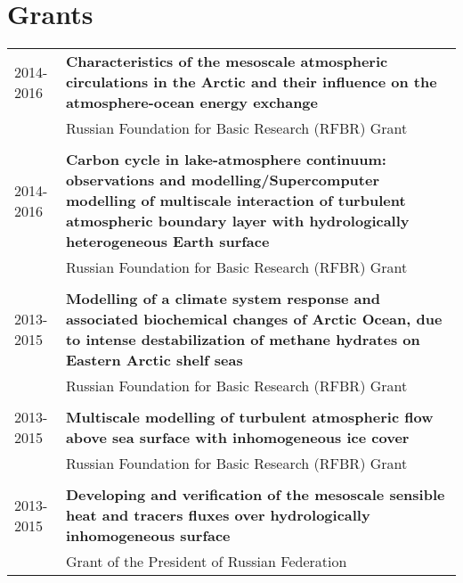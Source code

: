 \documentclass[a4paper,10pt]{article}
\newlength{\mycol}
\begin{document}
\section{Grants}
\begin{tabu} to 	
 2014-2016 & \textbf{Characteristics of the mesoscale atmospheric circulations in the Arctic and their influence on the atmosphere-ocean energy exchange} \\
& Russian Foundation for Basic Research (RFBR) Grant \\
 \\

 2014-2016 & \textbf{Carbon cycle in lake-atmosphere continuum: observations and modelling/Supercomputer modelling of multiscale interaction of turbulent atmospheric boundary layer with hydrologically heterogeneous Earth surface} \\
& Russian Foundation for Basic Research (RFBR) Grant \\
 \\

 2013-2015 & \textbf{Modelling of a climate system response and associated biochemical changes of Arctic Ocean, due to intense destabilization of methane hydrates on Eastern Arctic shelf seas}\\
& Russian Foundation for Basic Research (RFBR) Grant \\
 \\

 2013-2015 & \textbf{Multiscale modelling of turbulent atmospheric flow above sea surface with inhomogeneous ice cover}\\
& Russian Foundation for Basic Research (RFBR) Grant \\
 \\

 2013-2015 & \textbf{Developing and verification of the mesoscale sensible heat and tracers fluxes over hydrologically inhomogeneous surface} \\ 
& Grant of the President of Russian Federation
\end{tabu}
      
\end{document}
